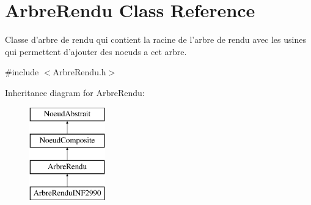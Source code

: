 \hypertarget{class_arbre_rendu}{\section{Arbre\-Rendu Class Reference}
\label{class_arbre_rendu}
}


Classe d'arbre de rendu qui contient la racine de l'arbre de rendu avec les usines qui permettent d'ajouter des noeuds a cet arbre.  




{\ttfamily \#include $<$Arbre\-Rendu.\-h$>$}

Inheritance diagram for Arbre\-Rendu\-:\begin{figure}[H]
\begin{center}
\leavevmode
\includegraphics[height=4.000000cm]{class_arbre_rendu}
\end{center}
\end{figure}
